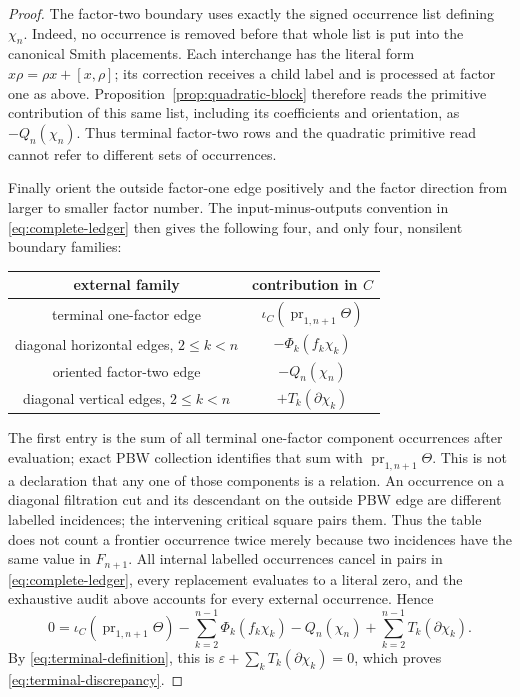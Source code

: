 \documentclass[11pt]{amsart}
\theoremstyle{remark}
\newcommand{\pr}{\operatorname{pr}}
\begin{document}
\begin{proof}
The factor-two boundary uses exactly the signed occurrence list defining
$\chi_n$.  Indeed, no occurrence is removed before that whole list is
put into the canonical Smith placements.  Each interchange has the
literal form $x\rho=\rho x+[x,\rho]$; its correction receives a child
label and is processed at factor one as above.
Proposition~\ref{prop:quadratic-block} therefore reads the primitive contribution of
this same list, including its coefficients and orientation, as
$-Q_n(\chi_n)$.  Thus terminal factor-two rows and the quadratic
primitive read cannot refer to different sets of occurrences.

Finally orient the outside factor-one edge positively and the factor
direction from larger to smaller factor number.  The input-minus-outputs
convention in \eqref{eq:complete-ledger} then gives the following four,
and only four, nonsilent boundary families:
\begin{center}
\begin{tabular}{c|c}
 external family & contribution in $C$ \\ \hline
 terminal one-factor edge &
 $\iota_C(\pr_{1,n+1}\Theta)$ \\
 diagonal horizontal edges, $2\leq k<n$ &
 $-\Phi_k(f_k\chi_k)$ \\
 oriented factor-two edge & $-Q_n(\chi_n)$ \\
 diagonal vertical edges, $2\leq k<n$ &
 $+T_k(\partial\chi_k)$
\end{tabular}
\end{center}
The first entry is the sum of all terminal one-factor component
occurrences after evaluation; exact PBW collection identifies that sum
with $\pr_{1,n+1}\Theta$.  This is not a declaration that any one of
those components is a relation.  An occurrence on a diagonal filtration
cut and its descendant on the outside PBW edge are different labelled
incidences; the intervening critical square pairs them.  Thus the table
does not count a frontier occurrence twice merely because two incidences
have the same value in $F_{n+1}$.  All internal labelled occurrences
cancel in pairs in \eqref{eq:complete-ledger}, every replacement
evaluates to a literal zero, and the exhaustive audit above accounts for
every external occurrence.  Hence
\begin{equation}\label{eq:evaluated-complete-ledger}
 0=\iota_C(\pr_{1,n+1}\Theta)
   -\sum_{k=2}^{n-1}\Phi_k(f_k\chi_k)-Q_n(\chi_n)
   +\sum_{k=2}^{n-1}T_k(\partial\chi_k).
\end{equation}
By \eqref{eq:terminal-definition}, this is
$\varepsilon+\sum_kT_k(\partial\chi_k)=0$, which proves
\eqref{eq:terminal-discrepancy}.


\end{proof}
\end{document}
